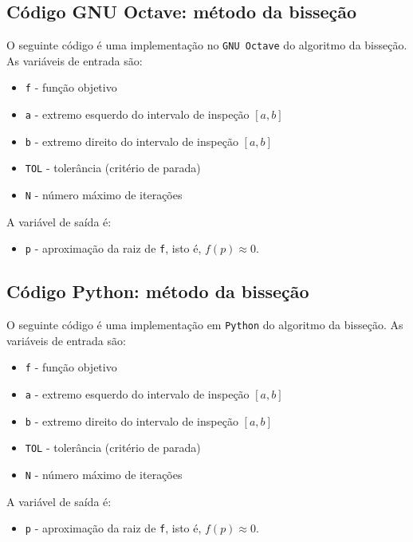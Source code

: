 
\fi
\ifisoctave
\subsection{Código GNU Octave: método da bisseção}\label{subsec:codigo_bissecao}

O seguinte código é uma implementação no \verb+GNU Octave+ do algoritmo da bisseção. As variáveis de entrada são:
\begin{itemize}
\item \verb+f+ - função objetivo
\item \verb+a+ - extremo esquerdo do intervalo de inspeção $[a, b]$
\item \verb+b+ - extremo direito do intervalo de inspeção $[a, b]$
\item \verb+TOL+ - tolerância (critério de parada)
\item \verb+N+ - número máximo de iterações
\end{itemize}
A variável de saída é:
\begin{itemize}
\item \verb+p+ - aproximação da raiz de \verb+f+, isto é, $f(p) \approx 0$.
\end{itemize}


\fi
\ifispython
\subsection{Código Python: método da bisseção}\label{subsec:codigo_bissecao}

O seguinte código é uma implementação em \verb+Python+ do algoritmo da bisseção. As variáveis de entrada são:
\begin{itemize}
\item \verb+f+ - função objetivo
\item \verb+a+ - extremo esquerdo do intervalo de inspeção $[a, b]$
\item \verb+b+ - extremo direito do intervalo de inspeção $[a, b]$
\item \verb+TOL+ - tolerância (critério de parada)
\item \verb+N+ - número máximo de iterações
\end{itemize}
A variável de saída é:
\begin{itemize}
\item \verb+p+ - aproximação da raiz de \verb+f+, isto é, $f(p) \approx 0$.
\end{itemize}

